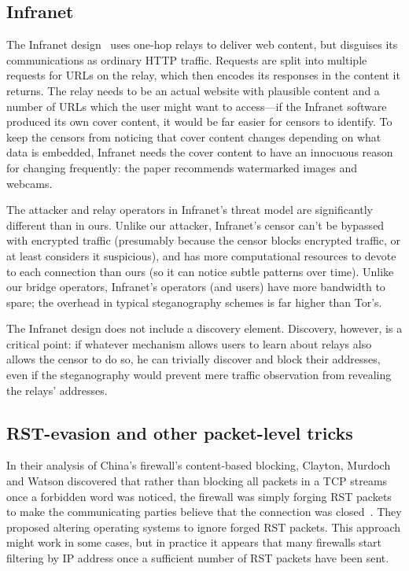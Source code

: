 \documentclass{llncs}
\begin{document}
\subsection{Infranet}

The Infranet design~\cite{infranet} uses one-hop relays to deliver web
content, but disguises its communications as ordinary HTTP traffic.  Requests
are split into multiple requests for URLs on the relay, which then encodes
its responses in the content it returns.  The relay needs to be an actual
website with plausible content and a number of URLs which the user might want
to access---if the Infranet software produced its own cover content, it would
be far easier for censors to identify.  To keep the censors from noticing
that cover content changes depending on what data is embedded, Infranet needs
the cover content to have an innocuous reason for changing frequently: the
paper recommends watermarked images and webcams.

The attacker and relay operators in Infranet's threat model are significantly
different than in ours.  Unlike our attacker, Infranet's censor can't be
bypassed with encrypted traffic (presumably because the censor blocks
encrypted traffic, or at least considers it suspicious), and has more
computational resources to devote to each connection than ours (so it can
notice subtle patterns over time).  Unlike our bridge operators, Infranet's
operators (and users) have more bandwidth to spare; the overhead in typical
steganography schemes is far higher than Tor's.

The Infranet design does not include a discovery element.  Discovery,
however, is a critical point: if whatever mechanism allows users to learn
about relays also allows the censor to do so, he can trivially discover and
block their addresses, even if the steganography would prevent mere traffic
observation from revealing the relays' addresses.

\subsection{RST-evasion and other packet-level tricks}

In their analysis of China's firewall's content-based blocking, Clayton,
Murdoch and Watson discovered that rather than blocking all packets in a TCP
streams once a forbidden word was noticed, the firewall was simply forging
RST packets to make the communicating parties believe that the connection was
closed~\cite{clayton:pet2006}. They proposed altering operating systems
to ignore forged RST packets. This approach might work in some cases, but
in practice it appears that many firewalls start filtering by IP address
once a sufficient number of RST packets have been sent.
\end{document}
